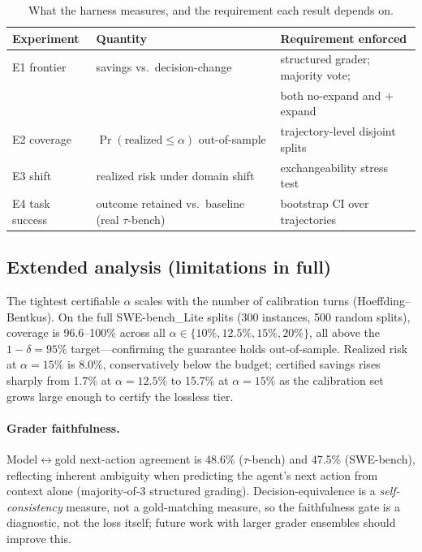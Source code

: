 \documentclass{article}
\begin{document}
\begin{table}[t]
\centering
\caption{What the harness measures, and the requirement each result depends on.}
\begin{tabular}{@{}lll@{}}
\toprule
Experiment & Quantity & Requirement enforced \\
\midrule
E1 frontier & savings vs.\ decision-change & structured grader; majority vote; \\
            &                               & both no-expand and $+$expand \\
E2 coverage & $\Pr(\text{realized}\le\alpha)$ out-of-sample & trajectory-level disjoint splits \\
E3 shift & realized risk under domain shift & exchangeability stress test \\
E4 task success & outcome retained vs.\ baseline (real $\tau$-bench) & bootstrap CI over trajectories \\
\bottomrule
\end{tabular}
\end{table}


\subsection{Extended analysis (limitations in full)}
The tightest certifiable $\alpha$ scales with the number of calibration turns
(Hoeffding--Bentkus). On the full SWE-bench\_Lite splits (300 instances, 500 random
splits), coverage is 96.6--100\% across all $\alpha \in \{10\%, 12.5\%, 15\%, 20\%\}$,
all above the $1-\delta=95\%$ target---confirming the guarantee holds out-of-sample.
Realized risk at $\alpha=15\%$ is 8.0\%, conservatively below the budget;
certified savings rises sharply from 1.7\% at $\alpha=12.5\%$ to 15.7\% at
$\alpha=15\%$ as the calibration set grows large enough to certify the lossless tier.

\paragraph{Grader faithfulness.} Model$\leftrightarrow$gold next-action agreement is
48.6\% ($\tau$-bench) and 47.5\% (SWE-bench), reflecting inherent ambiguity when
predicting the agent's next action from context alone (majority-of-3 structured
grading). Decision-equivalence is a \emph{self-consistency} measure, not a
gold-matching measure, so the faithfulness gate is a diagnostic, not the loss
itself; future work with larger grader ensembles should improve this.
\end{document}
